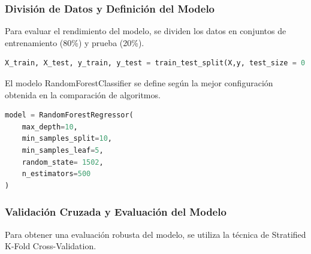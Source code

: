 \subsubsection{División de Datos y Definición del Modelo}

Para evaluar el rendimiento del modelo, se dividen los datos en conjuntos de entrenamiento (80\%) y prueba (20\%).

\begin{lstlisting}[language=Python, caption=División de datos para entrenamiento y prueba, label=lst:train_test_split_RFC]
X_train, X_test, y_train, y_test = train_test_split(X,y, test_size = 0.2,random_state= 1502)
\end{lstlisting}

El modelo RandomForestClassifier se define según la mejor configuración obtenida en la comparación de algoritmos.


\begin{lstlisting}[language=Python, caption=Definición del modelo RandomForestRegressor, label=lst:def_RFC]
model = RandomForestRegressor( 
    max_depth=10, 
    min_samples_split=10, 
    min_samples_leaf=5,
    random_state= 1502,
    n_estimators=500
)
\end{lstlisting}

\subsubsection{Validación Cruzada y Evaluación del Modelo}

Para obtener una evaluación robusta del modelo, se utiliza la técnica de Stratified K-Fold Cross-Validation.

